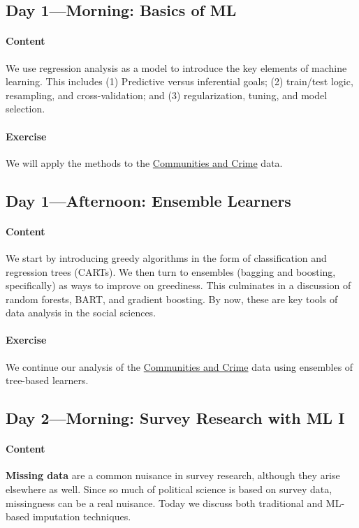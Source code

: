 \documentclass{article}
\begin{document}
\subsection{Day 1---Morning: Basics of ML}
\paragraph{Content}
We use regression analysis as a model to introduce the key elements of machine learning. This includes (1) Predictive versus inferential goals; (2) train/test logic, resampling, and cross-validation; and (3) regularization, tuning, and model selection.

\paragraph{Exercise}
We will apply the methods to the \href{https://archive.ics.uci.edu/dataset/183/communities+and+crime}{Communities and Crime} data.

\subsection{Day 1---Afternoon: Ensemble Learners}
\paragraph{Content}
We start by introducing greedy algorithms in the form of classification and regression trees (CARTs). We then turn to ensembles (bagging and boosting, specifically) as ways to improve on greediness. This culminates in a discussion of random forests, BART, and gradient boosting. By now, these are key tools of data analysis in the social sciences.

\paragraph{Exercise}
We continue our analysis of the \href{https://archive.ics.uci.edu/dataset/183/communities+and+crime}{Communities and Crime} data using ensembles of tree-based learners.

\subsection{Day 2---Morning: Survey Research with ML I}
\paragraph{Content}
\textbf{Missing data} are a common nuisance in survey research, although they arise elsewhere as well. Since so much of political science is based on survey data, missingness can be a real nuisance. Today we discuss both traditional and ML-based imputation techniques.
\end{document}
